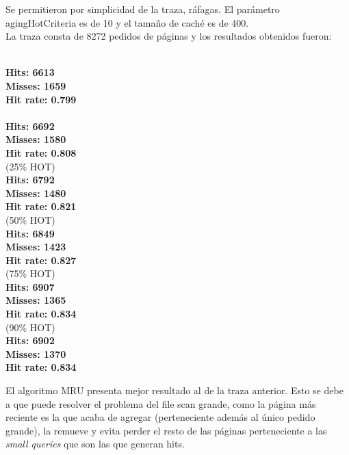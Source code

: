 \documentclass[11pt, a4paper, spanish]{article}
\begin{document}
Se permitieron por simplicidad de la traza, r\'afagas. El par\'ametro agingHotCriteria es de 10 y el tama\~{n}o de cach\'e es de 400.\\
La traza consta de 8272 pedidos de p\'aginas y los resultados obtenidos fueron:
   
\begin{multicols}{2}

\\
\textbf{Hits: 6613}\\
\textbf{Misses: 1659}\\
\textbf{Hit rate: 0.799}\\

\\
\textbf{Hits: 6692}\\
\textbf{Misses: 1580}\\
\textbf{Hit rate: 0.808}\\

 (25\% HOT)\\
\textbf{Hits: 6792}\\
\textbf{Misses: 1480}\\
\textbf{Hit rate: 0.821}\\

 (50\% HOT)\\
\textbf{Hits: 6849}\\
\textbf{Misses: 1423}\\
\textbf{Hit rate: 0.827}\\

 (75\% HOT)\\
\textbf{Hits: 6907}\\
\textbf{Misses: 1365}\\
\textbf{Hit rate: 0.834}\\

 (90\% HOT)\\
\textbf{Hits: 6902}\\
\textbf{Misses: 1370}\\
\textbf{Hit rate: 0.834}\\

\end{multicols}

El algoritmo MRU presenta mejor resultado al de la traza anterior. Esto se debe a que puede resolver el problema del file scan grande, 
como la p\'agina m\'as reciente es la que acaba de agregar (perteneciente adem\'as al \'unico pedido grande), la remueve y evita perder el 
resto de las p\'aginas perteneciente a las \textit{small queries} que son las que generan hits.\\
\end{document}
